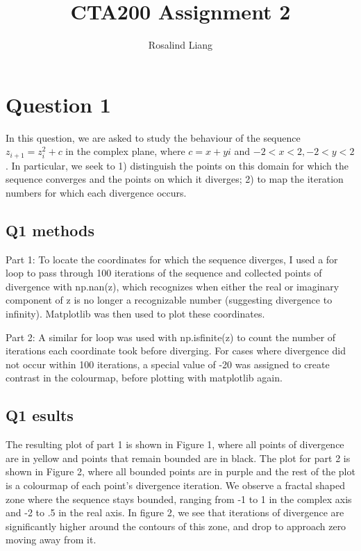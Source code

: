 \documentclass[apj]{emulateapj}
\begin{document}
\title{CTA200 Assignment 2}
 
\author{Rosalind Liang}
 


\section{Question 1}
\label{sec:Question 1}

In this question, we are asked to study the behaviour of the sequence $z_{i+1}=z_i^2+c$ in the complex plane, where $c = x + yi$ and $-2<x<2,   -2<y<2$. In particular, we seek to 1) distinguish the points on this domain for which the sequence converges and the points on which it diverges; 2) to map the iteration numbers for which each divergence occurs.
\subsection{Q1 methods}
\label{sec:cmb_data}

Part 1: To locate the coordinates for which the sequence diverges, I used a for loop to pass through 100 iterations of the sequence and collected points of divergence with np.nan(z), which recognizes when either the real or imaginary component of z is no longer a recognizable number (suggesting divergence to infinity). Matplotlib was then used to plot these coordinates. 

Part 2: A similar for loop  was used with np.isfinite(z) to count the number of iterations each coordinate took before diverging. For cases where divergence did not occur within 100 iterations, a special value of -20 was assigned to create contrast in the colourmap, before plotting with matplotlib again.

\subsection{Q1 esults}
\label{sec:Q1 results}
The resulting plot of part 1 is shown in Figure 1, where all points of divergence are in yellow and points that remain bounded are in black. The plot for part 2 is shown in Figure 2, where all bounded points are in purple and the rest of the plot is a colourmap of each point's divergence iteration. We observe a fractal shaped zone where the sequence stays bounded, ranging from -1 to 1 in the complex axis and -2 to .5 in the real axis. In figure 2, we see that iterations of divergence are significantly higher around the contours of this zone, and drop to approach zero moving away from it. 
\end{document}
